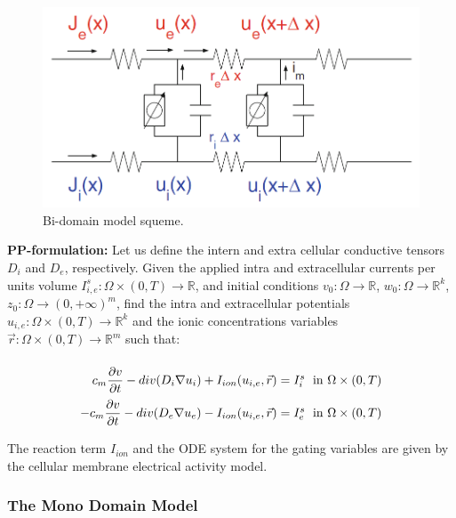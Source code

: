 \begin{figure}[H]
\centering
\includegraphics[scale=.35]{fig/cable_model}
\caption{Bi-domain model squeme.} \label{fig:bidomain_model}
\end{figure}

\textbf{PP-formulation:} Let us define the intern and extra cellular conductive tensors $D_i$ and $D_e$, respectively. Given the applied intra and extracellular currents per units volume $I_{i,e}^s: \Omega \times (0,T) \rightarrow \mathbb{R}$, and initial conditions $v_0 : \Omega \rightarrow \mathbb{R}$, $w_0: \Omega \rightarrow \mathbb{R}^k$, $z_0: \Omega \rightarrow (0, +\infty)^m$, find the intra and extracellular potentials $u_{i,e}:\Omega \times (0,T) \rightarrow \mathbb{R}^k$ and the ionic concentrations variables $\vec{r}: \Omega \times (0,T) \rightarrow \mathbb{R}^m$ such that:

\begin{equation}
\arraycolsep=1.4pt\def\arraystretch{2.2}
\begin{array}{rlr}
c_m \dfrac{\partial v}{\partial t} - div(D_i \nabla u_i) + I_{ion}(u_{i,e}, \vec{r}) &= I_{i}^s & \text{ in } \Omega \times (0,T) \\
-c_m \dfrac{\partial v}{\partial t } - div(D_e \nabla u_e) - I_{ion}(u_{i,e}, \vec{r}) &= I_e^s & \text{ in }\Omega \times (0,T) \\
\end{array}
\label{eq:BDM}
\end{equation}

The reaction term $I_{ion}$ and the ODE system for the gating variables are given by the cellular membrane electrical activity model. 

\subsubsection{The Mono Domain Model}

